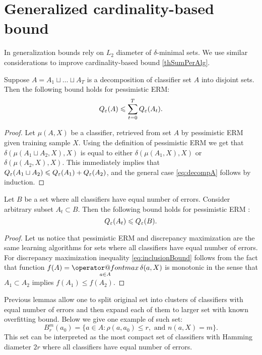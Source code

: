 \documentclass{article}
\makeatletter
\let\cite\citep
\renewcommand{\leq}{\leqslant}
\renewcommand{\max}{\mathop{\operator@font max}\limits}
\makeatother
\begin{document}
\section{Generalized cardinality-based bound}

In \cite{koltchinskii11oracle} generalization bounds rely on $L_2$ diameter of $\delta$-minimal sets.
We use similar considerations to improve cardinality-based bound \eqref{thSumPerAlg}.

\begin{lemma}
\label{lem:decompA}
Suppose $A = A_1 \sqcup \dots \sqcup A_T$ is a decomposition of classifier set $A$ into disjoint sets.
Then the following bound holds for pessimistic ERM:
\begin{equation}
    \label{eq:decompA}
    Q_\eps(A) \leq \sum_{t = 0}^T Q_\eps(A_t).
\end{equation}
\end{lemma}
\begin{proof}
Let $\mu(A, X)$ be a classifier, retrieved from set $A$ by pessimistic ERM given training sample $X$.
Using the definition of pessimistic ERM we get that $\delta(\mu(A_1 \sqcup A_2, X), X)$ is equal to either $\delta(\mu(A_1, X), X)$ or $\delta(\mu(A_2, X), X)$.
This immediately implies that $Q_\eps(A_1 \sqcup A_2) \leq Q_\eps(A_1) + Q_\eps(A_2)$, and the general case \eqref{eq:decompA} follows by induction.
\end{proof}

\begin{lemma} 
\label{lem:inclusionBound}
Let $B$ be a set where all classifiers have equal number of errors.
Consider arbitrary subset $A_t \subset B$.
Then the following bound holds for pessimistic ERM :
\begin{equation}
\label{eq:inclusionBound}
    Q_\eps(A_t) \leq Q_\eps(B).
\end{equation}
\end{lemma}
\begin{proof}
Let us notice that pessimistic ERM and discrepancy maximization are the same learning algorithms for sets where all classifiers have equal number of errors.
For discrepancy maximization inequality \eqref{eq:inclusionBound} follows from the fact that function $f(A) = \max_{a \in A} \delta(a, X)$ is monotonic
in the sense that $A_1 \subset A_2$ implies $f(A_1) \leq f(A_2)$.
\end{proof}

Previous lemmas allow one to split original set into clusters of classifiers with equal number of errors
and then expand each of them to larger set with known overfitting bound. Below we give one example of such set:
\[B_r^m(a_0) = \{a \in A \colon \rho(a, a_0) \leq r, \text { and } n(a, X) = m\}.\]
This set can be interpreted as the most compact set of classifiers with Hamming diameter $2r$ where all classifiers have equal number of errors.
\end{document}
